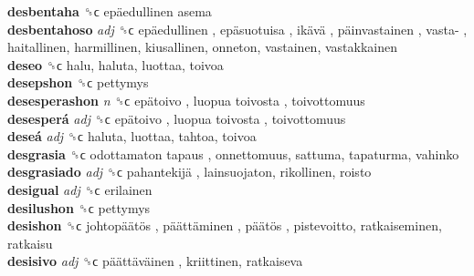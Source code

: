\textbf{desbentaha} ␝ϲ   epäedullinen asema   \\
\textbf{desbentahoso} \emph{adj}  ␝ϲ   epäedullinen ,  epäsuotuisa ,  ikävä ,  päinvastainen ,  vasta- , haitallinen, harmillinen, kiusallinen, onneton, vastainen, vastakkainen  \\
\textbf{deseo} ␝ϲ  halu, haluta, luottaa, toivoa  \\
\textbf{desepshon} ␝ϲ  pettymys  \\
\textbf{desesperashon} \emph{n}  ␝ϲ   epätoivo ,  luopua toivosta , toivottomuus  \\
\textbf{desesperá} \emph{adj}  ␝ϲ   epätoivo ,  luopua toivosta , toivottomuus  \\
\textbf{deseá} \emph{adj}  ␝ϲ  haluta, luottaa, tahtoa, toivoa  \\
\textbf{desgrasia} ␝ϲ   odottamaton tapaus , onnettomuus, sattuma, tapaturma, vahinko  \\
\textbf{desgrasiado} \emph{adj}  ␝ϲ   pahantekijä , lainsuojaton, rikollinen, roisto  \\
\textbf{desigual} \emph{adj}  ␝ϲ  erilainen  \\
\textbf{desilushon} ␝ϲ  pettymys  \\
\textbf{desishon} ␝ϲ   johtopäätös ,  päättäminen ,  päätös , pistevoitto, ratkaiseminen, ratkaisu  \\
\textbf{desisivo} \emph{adj}  ␝ϲ   päättäväinen , kriittinen, ratkaiseva  \\
